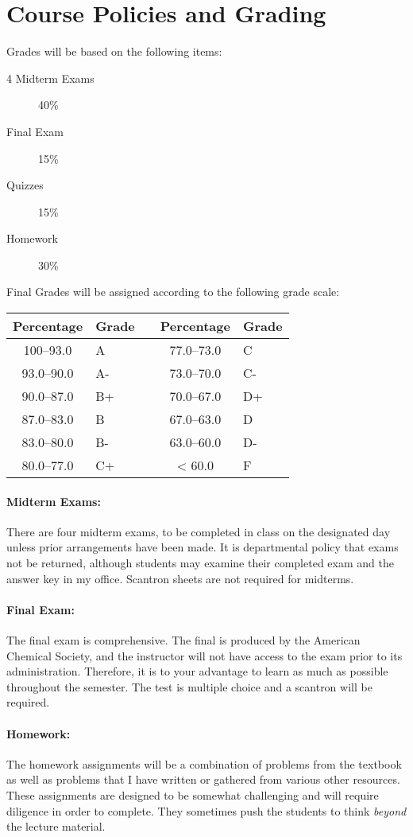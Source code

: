 \documentclass[12pt, letterpaper]{article}
\begin{document}
\section*{Course Policies and Grading}
Grades will be based on the following items:
\begin{description}
	\item[4 Midterm Exams] 40\%
	\item[Final Exam] 15\%
	\item[Quizzes] 15\%
	\item[Homework] 30\%
\end{description}
Final Grades will be assigned according to the following grade scale:

\begin{tabular}{cl|c|cl}
	Percentage & Grade &  & Percentage & Grade \\ \midrule
	100--93.0  & A     &  & 77.0--73.0 & C     \\
	93.0--90.0 & A-    &  & 73.0--70.0 & C-    \\
	90.0--87.0 & B+    &  & 70.0--67.0 & D+    \\
	87.0--83.0 & B     &  & 67.0--63.0 & D     \\
	83.0--80.0 & B-    &  & 63.0--60.0 & D-    \\
	80.0--77.0 & C+    &  & < 60.0     & F
\end{tabular}
\paragraph{Midterm Exams:}
There are four midterm exams, to be completed in class on the designated day unless prior arrangements have been made. It is departmental policy that exams not be returned, although students may examine their completed exam and the answer key in my office. Scantron sheets are not required for midterms.

\paragraph{Final Exam:}
The final exam is comprehensive. The final is produced by the American Chemical Society, and the instructor will not have access to the exam prior to its administration. Therefore, it is to your advantage to learn as much as possible throughout the semester. The test is multiple choice and a scantron will be required.

\paragraph{Homework:}
The homework assignments will be a combination of problems from the textbook as well as problems that I have written or gathered from various other resources. These assignments are designed to be somewhat challenging and will require diligence in order to complete. They sometimes push the students to think \emph{beyond} the lecture material.
\end{document}
